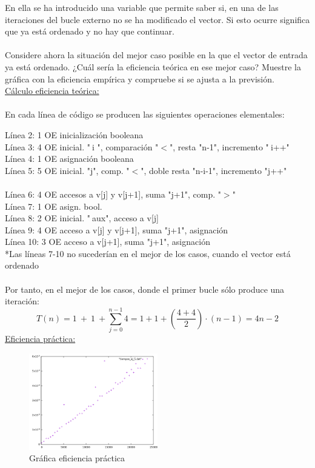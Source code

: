 \documentclass[titlepage, 12pt,a4paper]{article}
\begin{document}
En ella se ha introducido una variable que permite saber si, en una de las iteraciones del bucle externo no se ha modificado el vector. Si esto ocurre significa que ya está ordenado y no hay que continuar.\\\\
Considere ahora la situación del mejor caso posible en la que el vector de entrada ya está ordenado. ¿Cuál sería la eficiencia teórica en ese mejor caso? Muestre la gráfica con la eficiencia empírica y compruebe si se ajusta a la previsión.
\\

\underline{Cálculo eficiencia teórica:}
\\\\
En cada línea de código se producen las siguientes operaciones elementales:

Línea 2: 1 OE inicialización booleana\\
Línea 3: 4 OE inicial. "$\ $i ", comparación "$<$", resta "n-1", incremento "$\ $i++"\\
Línea 4: 1 OE asignación booleana\\
Línea 5: 5 OE inicial. "j", comp. "$<$", doble resta "n-i-1", incremento "j++"\\\\
Línea 6: 4 OE accesos a v[j] y v[j+1], suma "j+1", comp. "$>$"\\
Línea 7: 1 OE asign. bool.\\
Línea 8: 2 OE inicial. "$\ $aux", acceso a v[j]\\
Línea 9: 4 OE acceso a v[j] y v[j+1], suma "j+1", asignación\\
Línea 10: 3 OE acceso a v[j+1], suma "j+1", asignación\\

*Las líneas 7-10 no sucederían en el mejor de los casos, cuando el vector está ordenado
\ 
\\\\ 
Por tanto, en el mejor de los casos, donde el primer bucle sólo produce una iteración:\\ 
$$T(n)=1\ +\ 1\ +\sum \limits_{j=0}^{n-1} 4= 1+1+(\frac{4+4}{2})\cdot(n-1)= 4n-2 $$\newpage
\underline{Eficiencia práctica:}\\

\begin{figure}[!ht]
  \caption{Gráfica eficiencia práctica}
  \centering
    \includegraphics[width=0.5\textwidth]{./img/ef_pract_ej_5.png}
\end{figure}
\end{document}

